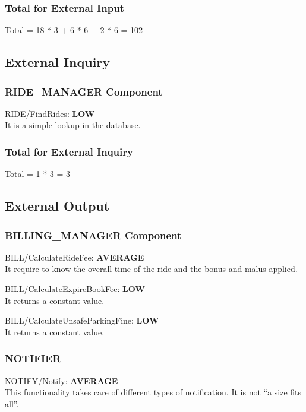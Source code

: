 \documentclass[11pt]{article} %
\newcommand{\extInput}[3]{ #1:  \textbf{#2} \\ #3  }
\begin{document}
\subsubsection{Total for External Input}
Total = 18 * 3 + 6 * 6 + 2 * 6 =  102

\subsection{External Inquiry}

\subsubsection{RIDE\_MANAGER Component}
\begin{description}
	\item \extInput
		{RIDE/FindRides}
		{LOW}
		{It is a simple lookup in the database.}
\end{description}

\subsubsection{Total for External Inquiry}
Total = 1 * 3 = 3

\subsection{External Output}

\subsubsection{BILLING\_MANAGER Component}
\begin{description}
	\item \extInput
		{BILL/CalculateRideFee}
		{AVERAGE}
		{It require to know the overall time of the ride and the bonus and malus applied.}
	\item \extInput
		{BILL/CalculateExpireBookFee}
		{LOW}
		{It returns a constant value.}
	\item \extInput
		{BILL/CalculateUnsafeParkingFine}
		{LOW}
		{It returns a constant value.}
\end{description}

\subsubsection{NOTIFIER}
\begin{description}
	\item \extInput
		{NOTIFY/Notify}
		{AVERAGE}
		{This functionality takes care of different types of notification. It is not ``a size fits all''.}
\end{description}
\end{document}
